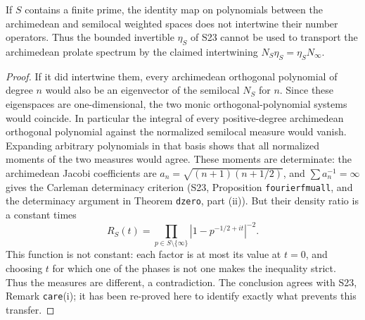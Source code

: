 \begin{proposition}
\label{AC-S10}
If \(S\) contains a finite prime, the identity map on polynomials
between the archimedean and semilocal weighted spaces does not
intertwine their number operators.  Thus the bounded invertible
\(\eta_S\) of S23 cannot be used to transport the archimedean
prolate spectrum by the claimed intertwining
\(N_S\eta_S=\eta_SN_\infty\).
\end{proposition}
\begin{proof}
If it did intertwine them, every archimedean orthogonal polynomial
of degree \(n\) would also be an eigenvector of the semilocal
\(N_S\) for \(n\).  Since these eigenspaces are one-dimensional,
the two monic orthogonal-polynomial systems would coincide.
In particular the integral of every positive-degree archimedean
orthogonal polynomial against the normalized semilocal measure would
vanish.  Expanding arbitrary polynomials in that basis shows that all
normalized moments of the two measures would agree.  These moments
are determinate: the archimedean Jacobi coefficients are
\(a_n=\sqrt{(n+1)(n+1/2)}\), and
\(\sum a_n^{-1}=\infty\) gives the Carleman determinacy criterion
(S23, Proposition \texttt{fourierfmuall}, and the determinacy argument
in Theorem \texttt{dzero}, part (ii)).
But their density ratio is a constant times
\[
 R_S(t)=\prod_{p\in S\setminus\{\infty\}}
                         |1-p^{-1/2+it}|^{-2}.
\]
This function is not constant: each factor is at most its value at
\(t=0\), and choosing \(t\) for which one of the phases is not one
makes the inequality strict.  Thus the measures are different, a
contradiction.  The conclusion agrees with S23, Remark
\texttt{care}(i); it has been re-proved here to identify exactly
what prevents this transfer.
\end{proof}

